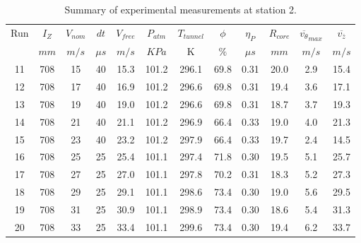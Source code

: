 \begin{table}[H]
\begin{center}
\begin{tabular}{|cccccccccccc|}
	\hline
	Run & $I_Z$ & $V_{nom}$ & $dt$ & $V_{free}$ & $P_{atm}$ & $T_{tunnel}$ & $\phi$ & $\eta_P$ & $R_{core}$ & $\overline{v_{\theta}}_{max}$ & $\overline{v_{\bar{z}}}$\\
	  & $mm$ & $m/s$ & $\mu s$ & $m/s$ & $KPa$ & K & $\%$ & $\mu s$ & $mm$ & $m/s$ & $m/s$\\
	\hline
	11 & 708 & 15 & 40 & 15.3 & 101.2 & 296.1 & 69.8 & 0.31 & 20.0 & 2.9 & 15.4\\
	12 & 708 & 17 & 40 & 16.9 & 101.2 & 296.6 & 69.8 & 0.31 & 19.4 & 3.6 & 17.1\\
	13 & 708 & 19 & 40 & 19.0 & 101.2 & 296.6 & 69.8 & 0.31 & 18.7 & 3.7 & 19.3\\
	14 & 708 & 21 & 40 & 21.1 & 101.2 & 296.9 & 66.4 & 0.33 & 19.0 & 4.0 & 21.3\\
	15 & 708 & 23 & 40 & 23.2 & 101.2 & 297.9 & 66.4 & 0.33 & 19.7 & 2.4 & 14.5\\
	16 & 708 & 25 & 25 & 25.4 & 101.1 & 297.4 & 71.8 & 0.30 & 19.5 & 5.1 & 25.7\\
	17 & 708 & 27 & 25 & 27.0 & 101.1 & 297.8 & 70.2 & 0.31 & 18.3 & 5.2 & 27.3\\
	18 & 708 & 29 & 25 & 29.1 & 101.1 & 298.6 & 73.4 & 0.30 & 19.0 & 5.6 & 29.5\\
	19 & 708 & 31 & 25 & 30.9 & 101.1 & 298.9 & 73.4 & 0.30 & 18.6 & 5.4 & 31.3\\
	20 & 708 & 33 & 25 & 33.4 & 101.1 & 299.6 & 73.4 & 0.30 & 19.4 & 6.2 & 33.7\\
	\hline
\end{tabular}
\caption{Summary of experimental measurements at station 2.}
\label{table:experiment_results_2}
\end{center}
\end{table}
